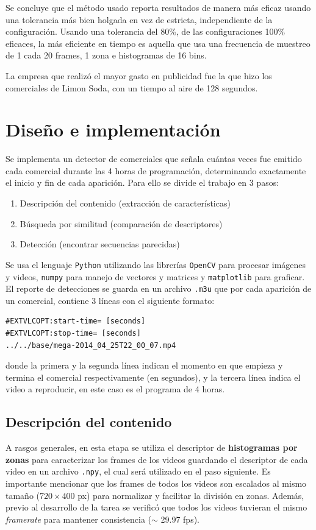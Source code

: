 \documentclass[14pt,letterpaper,hidelinks]{extarticle}
\begin{document}
Se concluye que el método usado reporta resultados de manera más eficaz usando una tolerancia más bien holgada en vez de estricta, independiente de la configuración. Usando una tolerancia del 80\%, de las configuraciones 100\% eficaces, la más eficiente en tiempo es aquella que usa una frecuencia de muestreo de 1 cada 20 frames, 1 zona e histogramas de 16 bins.

La empresa que realizó el mayor gasto en publicidad fue la que hizo los comerciales de Limon Soda, con un tiempo al aire de 128 segundos.

\section{Diseño e implementación}
Se implementa un detector de comerciales que señala cuántas veces fue emitido cada comercial durante las 4 horas de programación, determinando exactamente el inicio y
fin de cada aparición. Para ello se divide el trabajo en 3 pasos: 
\begin{enumerate}
\item Descripción del contenido (extracción de características)
\item Búsqueda por similitud (comparación de descriptores)
\item Detección (encontrar secuencias parecidas)
\end{enumerate}

Se usa el lenguaje \verb+Python+ utilizando las librerías \verb+OpenCV+ para procesar imágenes y videos, \verb+numpy+ para manejo de vectores y matrices y \verb+matplotlib+ para graficar.\\

El reporte de detecciones se guarda en un archivo \verb+.m3u+ que por cada aparición de un comercial, contiene 3 líneas con el siguiente formato: 
\begin{verbatim}
#EXTVLCOPT:start-time= [seconds]
#EXTVLCOPT:stop-time= [seconds]
../../base/mega-2014_04_25T22_00_07.mp4
\end{verbatim}
donde la primera y la segunda línea indican el momento en que empieza y termina el comercial respectivamente (en segundos), y la tercera línea indica el video a reproducir, en este caso es el programa de 4 horas.\\

\subsection{Descripción del contenido}
A rasgos generales, en esta etapa se utiliza el descriptor de \textbf{histogramas por zonas} para caracterizar los frames de los videos guardando el descriptor de cada video en un archivo \verb+.npy+, el cual será utilizado en el paso siguiente. Es importante mencionar que los frames de todos los videos son escalados al mismo tamaño ($720\times400$ px) para normalizar y facilitar la división en zonas. Además, previo al desarrollo de la tarea se verificó que todos los videos tuvieran el mismo \textit{framerate} para mantener consistencia ($\sim$ 29.97 fps).\\
\end{document}
